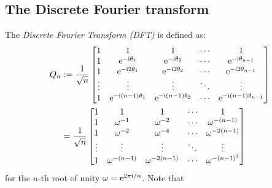 \subsection{The Discrete Fourier transform}
\begin{definition}[DFT] The \emph{Discrete Fourier Transform (DFT)} is defined as:
\begin{align*}
Q_n &:= {1 \over \sqrt{n}} \begin{bmatrix} 1 & 1 & 1&  \ensuremath{\cdots} & 1 \\
                                    1 & {\rm e}^{-{\rm i} \ensuremath{\theta}_1} & {\rm e}^{-{\rm i} \ensuremath{\theta}_2} & \ensuremath{\cdots} & {\rm e}^{-{\rm i} \ensuremath{\theta}_{n-1}} \\
                                    1 & {\rm e}^{-{\rm i} 2 \ensuremath{\theta}_1} & {\rm e}^{-{\rm i} 2 \ensuremath{\theta}_2} & \ensuremath{\cdots} & {\rm e}^{-{\rm i} 2\ensuremath{\theta}_{n-1}} \\
                                    \ensuremath{\vdots} & \ensuremath{\vdots} & \ensuremath{\vdots} & \ensuremath{\ddots} & \ensuremath{\vdots} \\
                                    1 & {\rm e}^{-{\rm i} (n-1) \ensuremath{\theta}_1} & {\rm e}^{-{\rm i} (n-1) \ensuremath{\theta}_2} & \ensuremath{\cdots} & {\rm e}^{-{\rm i} (n-1) \ensuremath{\theta}_{n-1}}
\end{bmatrix} \\
&= {1 \over \sqrt{n}} \begin{bmatrix} 1 & 1 & 1&  \ensuremath{\cdots} & 1 \\
                                    1 & \ensuremath{\omega}^{-1} & \ensuremath{\omega}^{-2} & \ensuremath{\cdots} & \ensuremath{\omega}^{-(n-1)}\\
                                    1 & \ensuremath{\omega}^{-2} & \ensuremath{\omega}^{-4} & \ensuremath{\cdots} & \ensuremath{\omega}^{-2(n-1)}\\
                                    \ensuremath{\vdots} & \ensuremath{\vdots} & \ensuremath{\vdots} & \ensuremath{\ddots} & \ensuremath{\vdots} \\
                                    1 & \ensuremath{\omega}^{-(n-1)} & \ensuremath{\omega}^{-2(n-1)} & \ensuremath{\cdots} & \ensuremath{\omega}^{-(n-1)^2}
\end{bmatrix}
\end{align*}
for the $n$-th root of unity $\ensuremath{\omega} = {\rm e}^{2\ensuremath{\pi}{\rm i}/n}$. Note that
\begin{align*}

\end{align*}
\end{definition}
